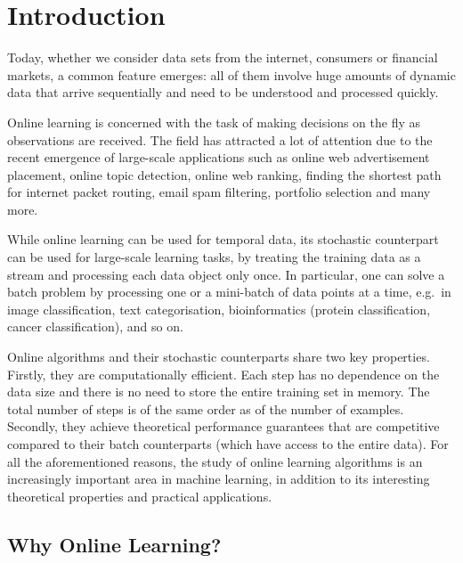 \chapter{\label{ch:ch1}Introduction}

\minitoc




Today, whether we consider data sets from the internet, consumers or financial markets, a common feature emerges: all of them involve huge amounts of dynamic data that arrive sequentially and need to be understood and processed quickly.

Online learning is concerned with the task of making decisions on the fly as observations are received. The field has attracted a lot of attention due to the recent emergence of large-scale applications such as online web advertisement placement, online topic detection, online web ranking, finding the shortest path for internet packet routing, email spam filtering, portfolio selection and many more.

While online learning can be used for temporal data, its stochastic counterpart can be used for large-scale learning tasks, by treating the training data as a stream and processing each data object only once. In particular, one can solve a batch problem by processing one or a mini-batch of data points at a time, e.g.\ in image classification, text categorisation, bioinformatics (protein classification, cancer classification), and so on.

Online algorithms and their stochastic counterparts share two key properties. Firstly, they are computationally efficient. Each step has no dependence on the data size and there is no need to store the entire training set in memory. The total number of steps is of the same order as of the number of examples. Secondly, they achieve theoretical performance guarantees that are competitive compared to their batch counterparts (which have access to the entire data). For all the aforementioned reasons, the study of online learning algorithms is an increasingly important area in machine learning, in addition to its interesting theoretical properties and practical applications.




\section{Why Online Learning?}

